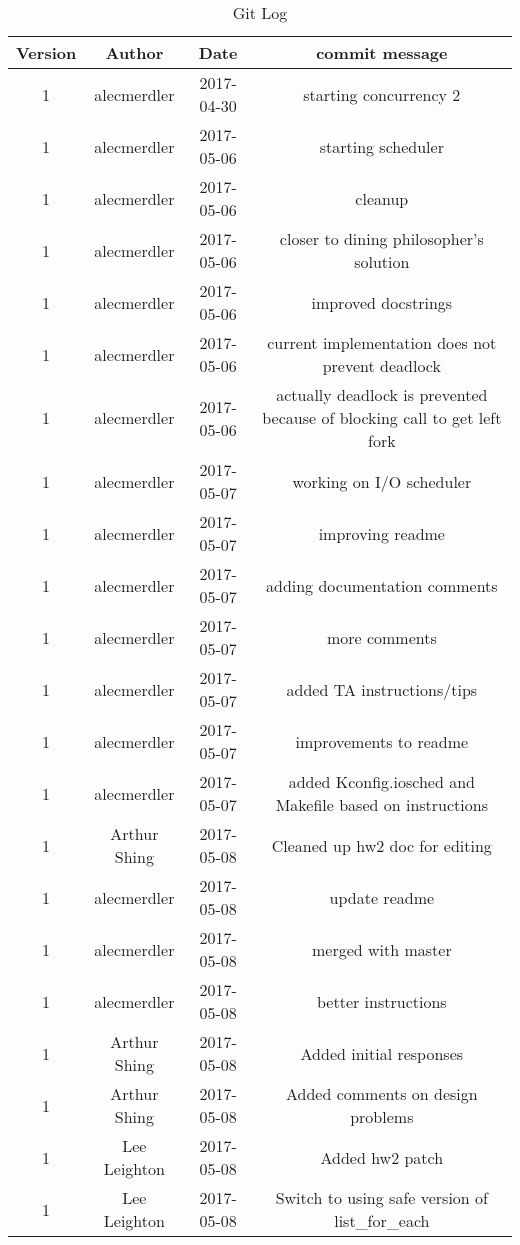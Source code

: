 \documentclass[journal, letterpaper, draftclsnofoot, onecolumn, 10pt]{IEEEtran}
\begin{document}
\FloatBarrier
\begin{table}[h!]
\centering
\caption{Git Log}
\begin{tabular}{|c|c|c|c|}
    \hline \textbf{Version} & \textbf{Author} & \textbf{Date} & \textbf{commit message}  \\
    \hline 1 & alecmerdler & 2017-04-30 & starting concurrency 2 \\
    \hline 1 & alecmerdler & 2017-05-06 & starting scheduler \\
    \hline 1 & alecmerdler & 2017-05-06 & cleanup \\
    \hline 1 & alecmerdler & 2017-05-06 & closer to dining philosopher's solution \\
    \hline 1 & alecmerdler & 2017-05-06 & improved docstrings\\
    \hline 1 & alecmerdler & 2017-05-06 & current implementation does not prevent deadlock \\
    \hline 1 & alecmerdler & 2017-05-06 & actually deadlock is prevented because of blocking call to get left fork \\
    \hline 1 & alecmerdler & 2017-05-07 & working on I/O scheduler \\
    \hline 1 & alecmerdler & 2017-05-07 & improving readme \\
    \hline 1 & alecmerdler & 2017-05-07 & adding documentation comments \\
    \hline 1 & alecmerdler & 2017-05-07 & more comments \\
    \hline 1 & alecmerdler & 2017-05-07 & added TA instructions/tips \\
    \hline 1 & alecmerdler & 2017-05-07 & improvements to readme\\
    \hline 1 & alecmerdler & 2017-05-07 & added Kconfig.iosched and Makefile based on instructions \\
    \hline 1 & Arthur Shing & 2017-05-08 & Cleaned up hw2 doc for editing\\
    \hline 1 & alecmerdler & 2017-05-08 & update readme\\
    \hline 1 & alecmerdler & 2017-05-08 & merged with master\\
    \hline 1 & alecmerdler & 2017-05-08 & better instructions\\
    \hline 1 & Arthur Shing & 2017-05-08 & Added initial responses \\
    \hline 1 & Arthur Shing & 2017-05-08 & Added comments on design problems \\
    \hline 1 & Lee Leighton & 2017-05-08 & Added hw2 patch \\
    \hline 1 & Lee Leighton & 2017-05-08 & Switch to using safe version of list\_for\_each \\
    \hline
\end{tabular}
\end{table}
\FloatBarrier
\end{document}
